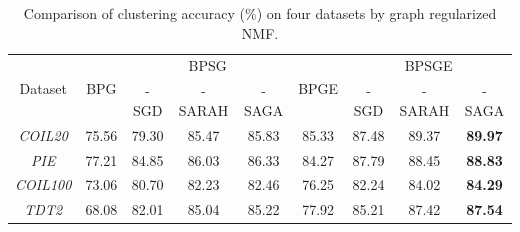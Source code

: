 \documentclass[letterpaper]{article} %
\begin{document}
	\begin{table}[!ht]
		\centering
		\begin{adjustbox}{max width=\textwidth}
			\begin{tabular}{c|c|c|c|c|c|c|c|c}\hline
				\multirow{2}{*}{Dataset}&\multirow{2}{*}{BPG} & \multicolumn{3}{c|}{BPSG} & \multirow{2}{*}{BPGE} & \multicolumn{3}{c}{BPSGE} \\ \cline{3-5}\cline{7-9}
				& & -SGD & -SARAH & -SAGA &  & -SGD & -SARAH & -SAGA \\\hline
				\emph{COIL20} & 75.56 &79.30& 85.47 & 85.83& 85.33& 87.48&89.37&\textbf{89.97}\\
				\emph{PIE} & 77.21 &84.85& 86.03 & 86.33& 84.27& 87.79&88.45&\textbf{88.83}\\
				\emph{COIL100} & 73.06 &80.70& 82.23 & 82.46& 76.25& 82.24&84.02&\textbf{84.29}\\
				\emph{TDT2} & 68.08 &82.01& 85.04 & 85.22& 77.92& 85.21&87.42&\textbf{87.54}\\\hline
			\end{tabular}
		\end{adjustbox}
		\caption{Comparison of clustering accuracy ($\%$)   on four datasets by graph regularized NMF.}
		\label{GNMG_clustering}
	\end{table}
\end{document}

